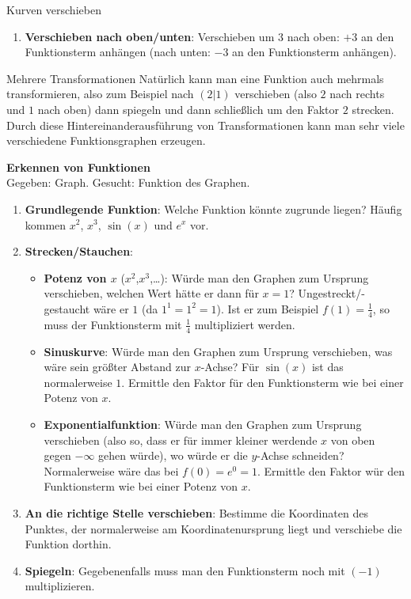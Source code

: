 \begin{bla}{Kurven verschieben}
\begin{enumerate}
    \item \textbf{Verschieben nach oben/unten}: Verschieben um $3$ nach oben: $+3$ an den Funktionsterm anhängen (nach unten: $-3$ an den Funktionsterm anhängen).
  \end{enumerate}
\end{bla}

\begin{bla}{Mehrere Transformationen}
  Natürlich kann man eine Funktion auch mehrmals transformieren, also zum Beispiel nach $(2|1)$ verschieben (also $2$ nach rechts und $1$ nach oben) dann spiegeln und dann schließlich um den Faktor $2$ strecken. Durch diese Hintereinanderausführung von Transformationen kann man sehr viele verschiedene Funktionsgraphen erzeugen.
\end{bla}

\begin{koch}
  \textbf{Erkennen von Funktionen} \\
  Gegeben: Graph. Gesucht: Funktion des Graphen.
  \begin{enumerate}
    \item \textbf{Grundlegende Funktion}: Welche Funktion könnte zugrunde liegen? Häufig kommen $x^2$, $x^3$, $\sin(x)$ und $e^x$ vor.
    \item \textbf{Strecken/Stauchen}:
      \begin{itemize}
        \item \textbf{Potenz von $x$} ($x^2$,$x^3$,\dots): Würde man den Graphen zum Ursprung verschieben, welchen Wert hätte er dann für $x=1$? Ungestreckt/-gestaucht wäre er $1$ (da $1^1=1^2=1$). Ist er zum Beispiel $f(1)=\frac{1}{4}$, so muss der Funktionsterm mit $\frac{1}{4}$ multipliziert werden.
        \item \textbf{Sinuskurve}: Würde man den Graphen zum Ursprung verschieben, was wäre sein größter Abstand zur $x$-Achse? Für $\sin(x)$ ist das normalerweise $1$. Ermittle den Faktor für den Funktionsterm wie bei einer Potenz von $x$.
        \item \textbf{Exponentialfunktion}: Würde man den Graphen zum Ursprung verschieben (also so, dass er für immer kleiner werdende $x$ von oben gegen $-\infty$ gehen würde), wo würde er die $y$-Achse schneiden? Normalerweise wäre das bei $f(0)=e^0=1$. Ermittle den Faktor wür den Funktionsterm wie bei einer Potenz von $x$.
      \end{itemize}
    \item \textbf{An die richtige Stelle verschieben}: Bestimme die Koordinaten des Punktes, der normalerweise am Koordinatenursprung liegt und verschiebe die Funktion dorthin.
    \item \textbf{Spiegeln}: Gegebenenfalls muss man den Funktionsterm noch mit $(-1)$ multiplizieren.
  \end{enumerate}
\end{koch}

